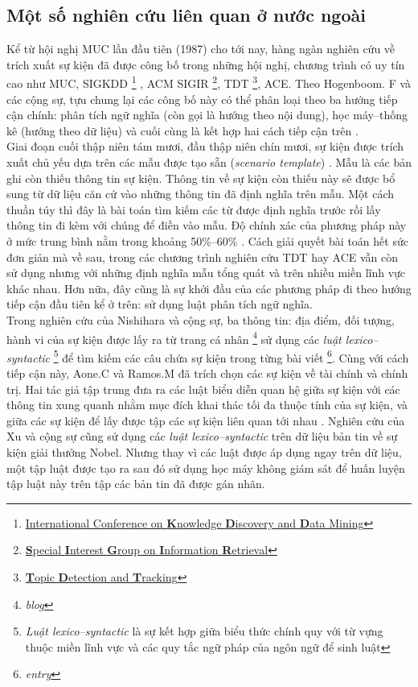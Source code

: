 	\subsection{Một số nghiên cứu liên quan ở nước ngoài}
\noindent Kể từ hội nghị MUC lần đầu tiên (1987) cho tới nay, hàng ngàn nghiên cứu về trích xuất sự kiện đã được công bố trong những  hội nghị, chương trình có uy tín cao như MUC, SIGKDD \footnote{\href{http://www.kdd.org/}{International Conference on \textbf{K}nowledge \textbf{D}iscovery and \textbf{D}ata Mining}} , ACM SIGIR \footnote{\href{http://www.sigir.org/}{\textbf{S}pecial \textbf{I}nterest \textbf{G}roup on \textbf{I}nformation \textbf{R}etrieval}}, TDT \footnote{\href{http://projects.ldc.upenn.edu/TDT/}{\textbf{T}opic \textbf{D}etection and \textbf{T}racking}}, ACE. Theo Hogenboom. F và các cộng sự, tựu chung lại các công bố này có thể phân loại theo ba hướng tiếp cận chính: phân tích ngữ nghĩa (còn gọi là hướng theo nội dung), học máy--thống kê (hướng theo dữ liệu) và cuối cùng là kết hợp hai  cách tiếp cận trên \cite{FFU11}.
\\
\noindent Giai đoạn cuối thập niên tám mươi, đầu thập niên chín mươi, sự kiện được trích xuất chủ yếu dựa trên các mẫu được tạo sẵn (\emph{scenario template}) \cite{BS92}. Mẫu là các bản ghi còn thiếu thông tin sự kiện. Thông tin về sự kiện còn thiếu  này sẽ được bổ sung từ dữ liệu căn cứ vào những thông tin đã định nghĩa trên mẫu. Một cách thuần túy thì đây là bài toán tìm kiếm các từ được định nghĩa trước rồi lấy thông tin đi kèm với chúng để điền vào mẫu. Độ chính xác của phương pháp này ở mức trung bình nằm trong khoảng 50$\%$--60$\%$ \cite{MW11}. Cách giải quyết bài toán hết sức đơn giản mà về sau, trong các chương trình nghiên cứu TDT hay ACE vẫn còn sử dụng nhưng với những định nghĩa mẫu tổng quát và trên nhiều miền lĩnh vực khác nhau. Hơn nữa, đây cũng là sự khởi đầu của các phương pháp đi theo hướng tiếp cận đầu tiên kể ở trên: sử dụng luật phân tích ngữ nghĩa.
\\
\noindent Trong nghiên cứu của Nishihara và cộng sự, ba thông tin: địa điểm, đối tượng, hành vi  của  sự kiện được lấy ra từ trang cá nhân \footnote{\emph{blog}} \cite{YKW09} sử dụng các \emph{luật lexico--syntactic} \footnote{\emph{Luật lexico--syntactic} là sự kết hợp giữa biểu thức chính quy với từ vựng thuộc miền lĩnh vực và các quy tắc ngữ pháp của ngôn ngữ để sinh luật} để tìm kiếm các câu chứa sự kiện trong từng bài viết \footnote{\emph{entry}}. Cùng với cách tiếp cận này, Aone.C và Ramos.M đã trích chọn các sự kiện về tài chính và chính trị. Hai tác giả tập trung đưa ra các luật biểu diễn quan hệ giữa sự kiện với các thông tin xung quanh nhằm mục đích khai thác tối đa thuộc tính của sự kiện, và giữa các sự kiện để lấy được tập các sự kiện liên quan tới nhau \cite{CM00}. Nghiên cứu của Xu và cộng sự cũng sử dụng các \emph{luật lexico--syntactic} trên dữ liệu bản tin về sự kiện giải thưởng Nobel. Nhưng thay vì các luật được áp dụng ngay trên dữ liệu, một tập luật được tạo ra sau đó sử dụng học máy không giám sát để huấn luyện tập luật này trên  tập các bản tin đã được gán nhãn.
